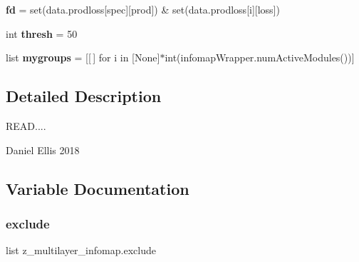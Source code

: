 \begin{DoxyCompactItemize}
{\bfseries fd} = set(data.\+prodloss\mbox{[}spec\mbox{]}\mbox{[}\textquotesingle{}prod\textquotesingle{}\mbox{]}) \& set(data.\+prodloss\mbox{[}i\mbox{]}\mbox{[}\textquotesingle{}loss\textquotesingle{}\mbox{]})
\item 
\mbox{\label{namespacez__multilayer__infomap_ac4bfc9d4aa8e316a4734848edbc84105}} 
int {\bfseries thresh} = 50
\item 
\mbox{\label{namespacez__multilayer__infomap_ad412f5a525d232746fdded1fe07e3033}} 
list {\bfseries mygroups} = \mbox{[}\mbox{[}$\,$\mbox{]} for i in \mbox{[}None\mbox{]}$\ast$int(infomap\+Wrapper.\+num\+Active\+Modules())\mbox{]}
\end{DoxyCompactItemize}


\subsection{Detailed Description}
\begin{DoxyVerb}READ....

Daniel Ellis 2018
\end{DoxyVerb}
 

\subsection{Variable Documentation}
\mbox{\label{namespacez__multilayer__infomap_a1274e84235528df114d9227cea5163d9}} 
\subsubsection{\texorpdfstring{exclude}{exclude}}
{\footnotesize\ttfamily list z\+\_\+multilayer\+\_\+infomap.\+exclude}

